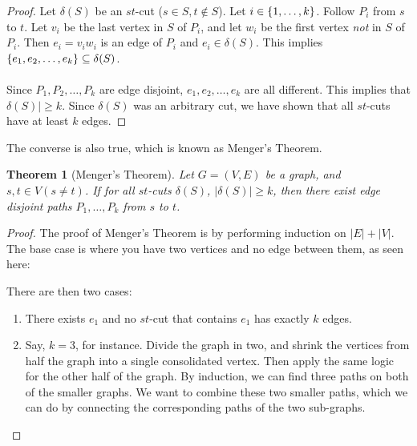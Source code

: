 \documentclass[]{article}
\newtheorem*{theorem}{Theorem}
\theoremstyle{definition}
\DeclarePairedDelimiter{\set}{\lbrace}{\rbrace}
\begin{document}
				\begin{proof}
					Let $\delta(S)$ be an $st$-cut ($s \in S, t \not \in S$). Let $i \in \set{1, \ldots, k}$. Follow $P_i$ from $s$ to $t$. Let $v_i$ be the last vertex in $S$ of $P_i$, and let $w_i$ be the first vertex \emph{not} in $S$ of $P_i$. Then $e_i = v_i w_i$ is an edge of $P_i$ and $e_i \in \delta(S)$. This implies $\set{e_1, e_2, \ldots, e_k} \subseteq \delta(S)$.
					\\ \\
					Since $P_1, P_2, \ldots, P_k$ are edge disjoint, $e_1, e_2, \ldots, e_k$ are all different. This implies that $\delta(S)| \ge k$. Since $\delta(S)$ was an arbitrary cut, we have shown that all $st$-cuts have at least $k$ edges.
				\end{proof}
			
				The converse is also true, which is known as Menger's Theorem.
			
				\begin{theorem}[Menger's Theorem]
					Let $G = (V, E)$ be a graph, and $s, t \in V (s \ne t)$. If for all $st$-cuts $\delta(S)$, $|\delta(S)| \ge k$, then there exist edge disjoint paths $P_1, \ldots, P_k$ from $s$ to $t$.
				\end{theorem}
			
				\begin{proof}
					The proof of Menger's Theorem is by performing induction on $|E| + |V|$. The base case is where you have two vertices and no edge between them, as seen here:
					\begin{center}
					\end{center}
				
					There are then two cases:
					\begin{enumerate}
						\item There exists $e_1$ and no $st$-cut that contains $e_1$ has exactly $k$ edges.
						\item Say, $k = 3$, for instance. Divide the graph in two, and shrink the vertices from half the graph into a single consolidated vertex. Then apply the same logic for the other half of the graph. By induction, we can find three paths on both of the smaller graphs. We want to combine these two smaller paths, which we can do by connecting the corresponding paths of the two sub-graphs.
					\end{enumerate}
				\end{proof}
\end{document}
